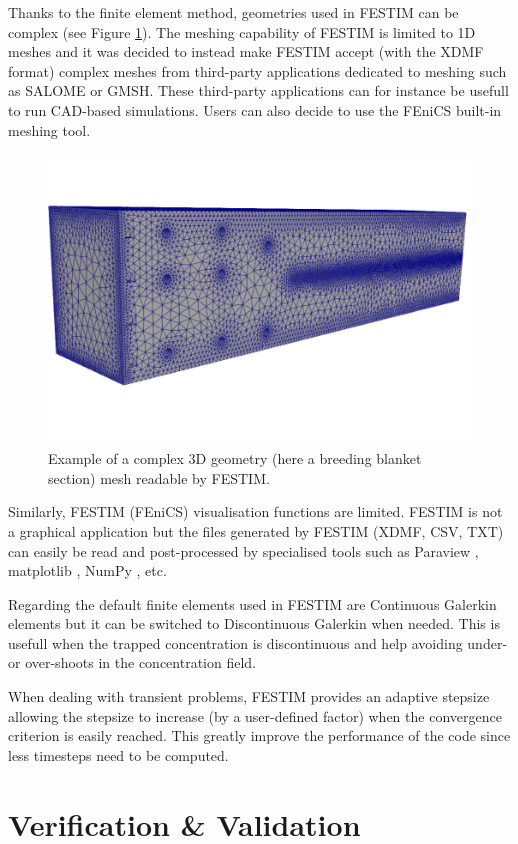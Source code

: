 Thanks to the finite element method, geometries used in FESTIM can be complex (see Figure \ref{fig: example mesh}).
The meshing capability of FESTIM is limited to 1D meshes and it was decided to instead make FESTIM accept (with the XDMF format) complex meshes from third-party applications dedicated to meshing such as SALOME or GMSH.
These third-party applications can for instance be usefull to run CAD-based simulations.
Users can also decide to use the FEniCS built-in meshing tool.

\begin{figure}
    \centering
    \includegraphics[width=0.5\linewidth]{Figures/Chapter2/example_mesh.png}
    \caption{Example of a complex 3D geometry (here a breeding blanket section) mesh readable by FESTIM.}
    \label{fig: example mesh}
\end{figure}

Similarly, FESTIM (FEniCS) visualisation functions are limited.
FESTIM is not a graphical application but the files generated by FESTIM (XDMF, CSV, TXT) can easily be read and post-processed by specialised tools such as Paraview , matplotlib , NumPy , etc.

Regarding the default finite elements used in FESTIM are Continuous Galerkin elements but it can be switched to Discontinuous Galerkin when needed.
This is usefull when the trapped concentration is discontinuous and help avoiding under- or over-shoots in the concentration field.

When dealing with transient problems, FESTIM provides an adaptive stepsize allowing the stepsize to increase (by a user-defined factor) when the convergence criterion is easily reached.
This greatly improve the performance of the code since less timesteps need to be computed.



\section{Verification \& Validation}

